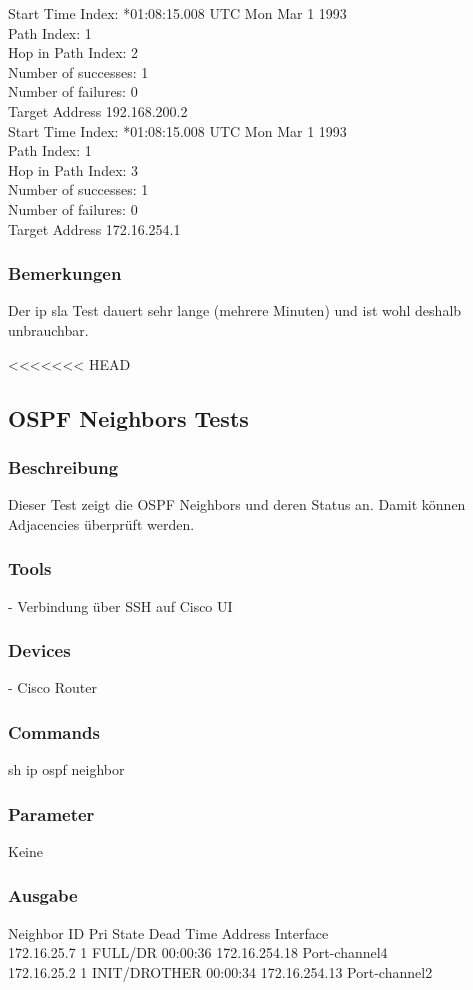 \documentclass[a4,12pt]{scrartcl}
\begin{document}
\noindent Start Time Index: *01:08:15.008 UTC Mon Mar 1 1993\\
Path Index: 1\\
Hop in Path Index: 2\\
Number of successes: 1\\
Number of failures: 0\\
Target Address 192.168.200.2\\

\noindent Start Time Index: *01:08:15.008 UTC Mon Mar 1 1993\\
Path Index: 1\\
Hop in Path Index: 3\\
Number of successes: 1\\
Number of failures: 0\\
Target Address 172.16.254.1
\subsubsection{Bemerkungen}
Der ip sla Test dauert sehr lange (mehrere Minuten) und ist wohl deshalb unbrauchbar.

<<<<<<< HEAD
\subsection{OSPF Neighbors Tests}
\subsubsection{Beschreibung}
Dieser Test zeigt die OSPF Neighbors und deren Status an. Damit können Adjacencies überprüft werden.
\subsubsection{Tools}
- Verbindung über SSH auf Cisco UI
\subsubsection{Devices}
- Cisco Router
\subsubsection{Commands}
sh ip ospf neighbor
\subsubsection{Parameter}
Keine
\subsubsection{Ausgabe}
Neighbor ID     Pri   State           Dead Time   Address         Interface\\
172.16.25.7       1   FULL/DR         00:00:36    172.16.254.18   Port-channel4\\
172.16.25.2       1   INIT/DROTHER    00:00:34    172.16.254.13   Port-channel2
\end{document}

